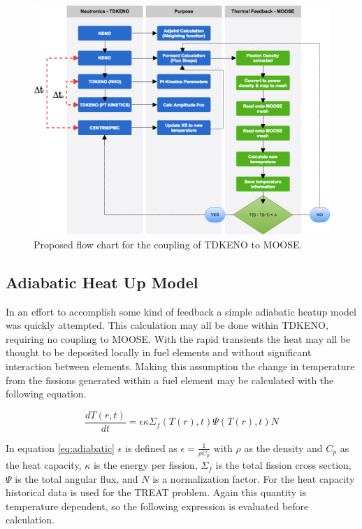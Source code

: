 \documentclass[11pt]{article}
\begin{document}
\begin{figure}[h]
    \centering
    \includegraphics[width=16cm]{figures/flowcharttdk.png}
    \caption{Proposed flow chart for the coupling of TDKENO to MOOSE.}
    \label{fig:flow}
\end{figure}

\subsection{Adiabatic Heat Up Model}

In an effort to accomplish some kind of feedback a simple adiabatic heatup model was quickly attempted.  This calculation may all be done within TDKENO, requiring no coupling to MOOSE.  With the rapid transients the heat may all be thought to be deposited locally in fuel elements and without significant interaction between elements.  Making this assumption the change in temperature from the fissions generated within a fuel element may be calculated with the following equation.

\begin{equation}
    \frac{dT(r,t)}{dt} = \epsilon \kappa \Sigma_f(T(r),t) \Psi(T(r),t) N
    \label{eq:adiabatic}
\end{equation}

In equation \ref{eq:adiabatic} $\epsilon$ is defined as $\epsilon = \frac{1}{\rho C_p}$ with $\rho$ as the density and $C_p$ as the heat capacity, $\kappa$ is the energy per fission, $\Sigma_f$ is the total fission cross section, $\Psi$ is the total angular flux, and $N$ is a normalization factor. For the heat capacity historical data is used for the TREAT problem.  Again this quantity is temperature dependent, so the following expression is evaluated before calculation.
\end{document}

